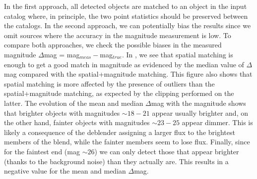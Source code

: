 \documentclass[twocolumn]{aastex62}
\begin{document}
In the first approach, all detected objects are matched to an object in the input catalog where, in principle, the two point statistics should be preserved between the catalogs. In the second approach, we can potentially bias the results since we omit sources where the accuracy in the magnitude measurement is low. To compare both approaches, we check the possible biases in the measured magnitude $\Delta$mag = mag$_{meas} - $mag$_{true}$. In , we see that spatial matching is enough to get a good match in magnitude as evidenced by the median value of $\Delta$mag compared with the spatial+magnitude matching. This figure also shows that spatial matching is more affected by the presence of outliers than the spatial+magnitude matching, as expected by the clipping performed on the latter. The evolution of the mean and median $\Delta$mag with the magnitude shows that brighter objects with magnitudes $\sim 18-21$ appear usually brighter and, on the other hand, fainter objects with magnitudes $\sim 23-25$ appear dimmer. This is likely a consequence of the deblender assigning a larger flux to the brightest members of the blend, while the fainter members seem to lose flux. Finally, since for the faintest end (mag $\sim 26$) we can only detect those that appear brighter (thanks to the background noise) than they actually are. This results in a negative value for the mean and median $\Delta$mag.
\end{document}
